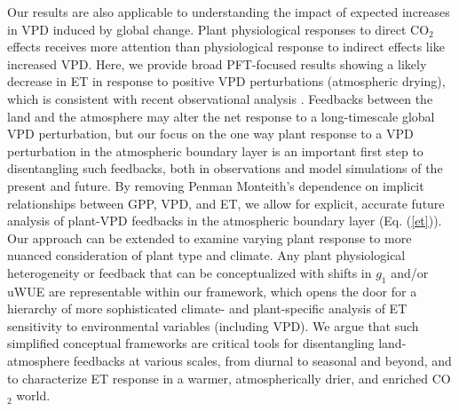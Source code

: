 Our results are also applicable to understanding the impact
of  expected increases in VPD
induced by global change.  Plant physiological responses to direct
CO$_2$ effects \citep[e.g.,][]{Swann_2016, Lemordant_2018} receives more attention
than physiological response to indirect effects like increased
VPD. Here, we provide broad PFT-focused results showing a likely
decrease in ET in response to positive VPD perturbations (atmospheric
drying), which is consistent with recent observational analysis
\citep[e.g.,][]{Rigden_2017}. Feedbacks between the land and the
atmosphere may alter the net response to a long-timescale global VPD perturbation,
but our focus on the one way plant response to a VPD perturbation in
the atmospheric boundary layer is an important first step to
disentangling such feedbacks, both in observations and model
simulations of the present and future. By removing Penman Monteith's
dependence on implicit relationships between GPP, VPD, and ET, we
allow for explicit, accurate future analysis of plant-VPD feedbacks
in the atmospheric boundary layer (Eq. (\ref{et})). Our approach
can be extended to examine varying plant response to more nuanced
consideration of plant type and climate. Any plant physiological
heterogeneity or feedback that can be conceptualized with shifts in $g_1$
\citep[e.g.][]{Lin_2015, Medlyn_2017} and/or uWUE
\citep[e.g.][]{Zhou_2014} are representable within our framework, which
opens the door for a hierarchy of more sophisticated climate- and
plant-specific analysis of ET sensitivity to environmental variables
(including VPD). We argue that such simplified conceptual frameworks
are critical tools for disentangling land-atmosphere feedbacks at
various scales, from diurnal to seasonal and beyond, and to
characterize ET response in a warmer, atmospherically drier, and
enriched CO$_2$ world.
